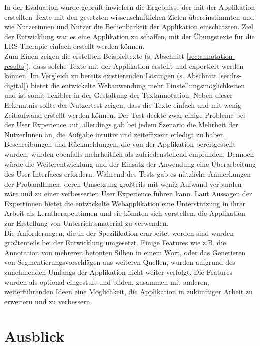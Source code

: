 In der Evaluation wurde geprüft inwiefern die Ergebnisse der mit der Applikation erstellten Texte mit den gesetzten wissenschaftlichen Zielen übereinstimmten und wie Nutzerinnen und Nutzer die Bedienbarkeit der Applikation einschätzten. Ziel der Entwicklung war es eine Applikation zu schaffen, mit der Übungstexte für die LRS Therapie einfach erstellt werden können.\\
Zum Einen zeigen die erstellten Beispieltexte (s. Abschnitt \ref{sec:annotation-results}), dass solche Texte mit der Applikation erstellt und exportiert werden können. Im Vergleich zu bereits existierenden Lösungen (s. Abschnitt \ref{sec:lrs-digital}) bietet die entwickelte Webanwendung mehr Einstellungsmöglichkeiten und ist somit flexibler in der Gestaltung der Textannotation. Neben dieser Erkenntnis sollte der Nutzertest zeigen, dass die Texte einfach und mit wenig Zeitaufwand erstellt werden können. Der Test deckte zwar einige Probleme bei der User Experience auf, allerdings gab bei jedem Szenario die Mehrheit der NutzerInnen an, die Aufgabe intuitiv und zeiteffizient erledigt zu haben. Beschreibungen und Rückmeldungen, die von der Applikation bereitgestellt wurden, wurden ebenfalls mehrheitlich als zufriedenstellend empfunden. Dennoch würde die Weiterentwicklung und der Einsatz der Anwendung eine Überarbeitung des User Interfaces erfordern. Während des Tests gab es nützliche Anmerkungen der ProbandInnen, deren Umsetzung großteils mit wenig Aufwand verbunden wäre und zu einer verbesserten User Experience führen kann. Laut Aussagen der Expertinnen bietet die entwickelte Webapplikation eine Unterstützung in ihrer Arbeit als Lerntherapeutinnen und sie könnten sich vorstellen, die Applikation zur Erstellung von Unterrichtsmaterial zu verwenden.\\
Die Anforderungen, die in der Spezifikation erarbeitet worden sind wurden größtenteils bei der Entwicklung umgesetzt. Einige Features wie z.B. die Annotation von mehreren betonten Silben in einem Wort, oder das Generieren von Segmentierungsvorschlägen aus weiteren Quellen, wurden aufgrund des zunehmenden Umfangs der Applikation nicht weiter verfolgt. Die Features wurden als optional eingestuft und bilden, zusammen mit anderen, weiterführenden Ideen eine Möglichkeit, die Applikation in zukünftiger Arbeit zu erweitern und zu verbessern.

\section{Ausblick}

